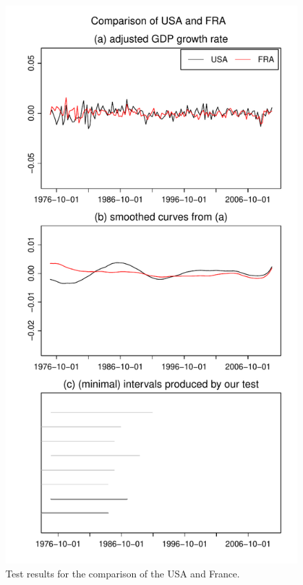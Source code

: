 \documentclass[12pt]{article}
\begin{document}
\begin{figure}
\hspace{0.1cm}
\begin{minipage}[t]{0.24\textwidth}
\includegraphics[width=\textwidth]{output/plots/gdp/USA_vs_FRA}
\caption{Test results for the comparison of the USA and France.}\label{fig:USA:France}
\end{minipage}
\hspace{0.1cm}

\end{figure}
\end{document}
